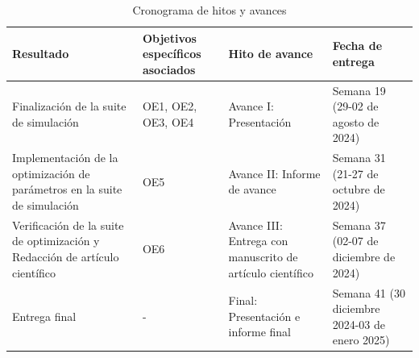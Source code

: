 \begin{table}[H]
	\centering
	\caption{Cronograma de hitos y avances}
	\label{tab:cron}
	\begin{tabular}{|p{4cm}|p{3.8cm}|p{4cm}|p{4cm}|}
		\hline
		\textbf{Resultado} & \textbf{Objetivos específicos asociados} & \textbf{Hito de avance} & \textbf{Fecha de entrega} \\ 
		\hline
		Finalización de la suite de simulación & OE1, OE2, OE3, OE4 & Avance I: Presentación & Semana 19 (29-02 de agosto de 2024) \\ 
		\hline
		Implementación de la optimización de parámetros en la suite de simulación & OE5 & Avance II: Informe de avance & Semana 31 (21-27 de octubre de 2024) \\ 
		\hline
		Verificación de la suite de optimización y Redacción de artículo científico & OE6 & Avance III: Entrega con manuscrito de artículo científico & Semana 37 (02-07 de diciembre de 2024) \\ 
		\hline
		Entrega final & - & Final: Presentación e informe final & Semana 41 (30 diciembre 2024-03 de enero 2025) \\ 
		\hline
	\end{tabular}
\end{table}

